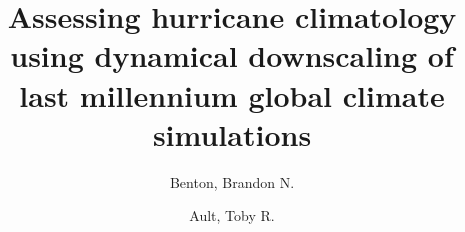 %
\RequirePackage{fix-cm}
%
%
\documentclass{article}
%
\usepackage{graphicx}
\usepackage{booktabs}
\usepackage{afterpage}
%
%
%
%
%


\title{Assessing hurricane climatology using dynamical downscaling of last millennium global climate simulations}




\author{Benton, Brandon N. \and Ault, Toby R.}
\maketitle



